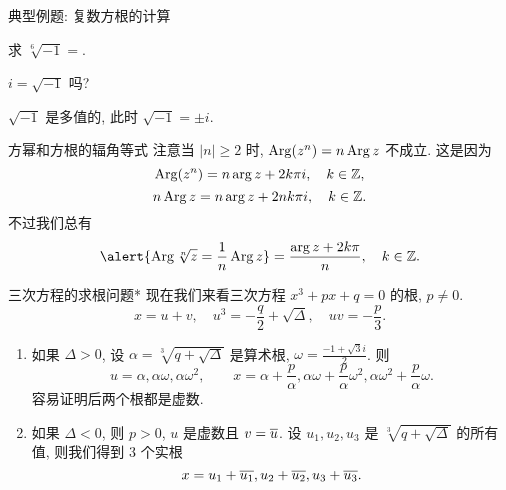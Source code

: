 \begin{frame}[<*>]{典型例题: 复数方根的计算}
\onslide<+->
\begin{exercise}
求 $\sqrt[6]{-1}=$.
\end{exercise}

\onslide<+->
\begin{thinking}
$i=\sqrt{-1}$ 吗?
\end{thinking}
\onslide<+->
\begin{answer}
$\sqrt{-1}$ 是多值的, 此时 $\sqrt{-1}=\pm i$.
\end{answer}
\end{frame}


\begin{frame}{方幂和方根的辐角等式}
\onslide<+->
注意当 $|n|\ge 2$ 时, \alert{$\operatorname{Arg}(z^n)=n\operatorname{Arg} z$ 不成立}.
\onslide<+->
这是因为
\[\operatorname{Arg}(z^n)=n\arg z+2k\pi i,\quad k\in{\mathbb{Z}},\]
\[n\operatorname{Arg} z=n\arg z+2nk\pi i,\quad k\in{\mathbb{Z}}.\]
\onslide<+->
不过我们总有
\[\alert{\Arg \sqrt[n]z=\dfrac1n\Arg z}=\dfrac{\arg z+2k\pi}n,\quad k\in\BZ.\]
\end{frame}
	

\begin{frame}{三次方程的求根问题*}
\onslide<+->
现在我们来看三次方程 $x^3+px+q=0$ 的根, $p\neq 0$.
\onslide<+->
\[x=u+v,\quad u^3=-\frac q2+\sqrt{\Delta},\quad uv=-\frac p3.\]
\begin{enumerate}
\item 如果 $\Delta>0$, 设 $\alpha=\sqrt[3]{q+\sqrt{\Delta}}$ 是算术根, $\omega=\frac{-1+\sqrt 3i}2$.
\onslide<+->
则
\[u=\alpha,\alpha\omega,\alpha\omega^2,\qquad
x=\alpha+\frac p\alpha, \alpha\omega+\frac p\alpha \omega^2, \alpha\omega^2+\frac p\alpha \omega.\]
\onslide<+->
容易证明后两个根都是虚数.
\item 如果 $\Delta<0$, 则 $p>0$, $u$ 是虚数且 $v=\overline u$.
\onslide<+->设 $u_1,u_2,u_3$ 是 $\sqrt[3]{q+\sqrt{\Delta}}$ 的所有值,
\onslide<+->
则我们得到 $3$ 个实根
\[x=u_1+\overline{u_1}, u_2+\overline{u_2}, u_3+\overline{u_3}.\]
\end{enumerate}
\end{frame}

